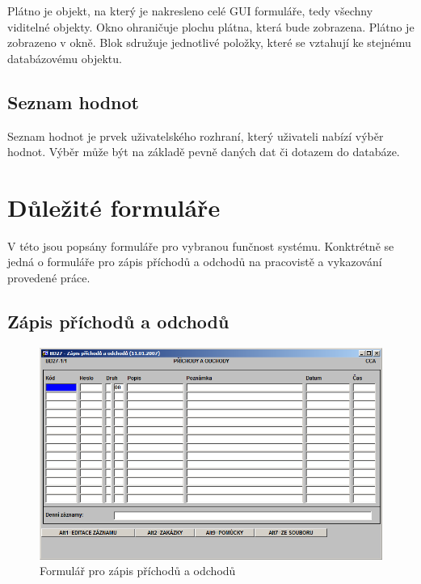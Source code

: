 \documentclass{diplomka}
\begin{document}
Plátno je objekt, na který je nakresleno celé GUI formuláře, tedy všechny viditelné objekty.  Okno ohraničuje plochu plátna, která bude zobrazena. Plátno je zobrazeno v okně. Blok sdružuje jednotlivé položky, které se vztahují ke stejnému databázovému objektu.
\subsection*{Seznam hodnot}
Seznam hodnot je prvek uživatelského rozhraní, který uživateli nabízí výběr hodnot. Výběr může být na základě pevně daných dat či dotazem do databáze.

\section{Důležité formuláře}
V této jsou popsány formuláře pro vybranou funčnost systému. 
 Konktrétně se jedná o formuláře pro zápis příchodů a odchodů na pracovistě a vykazování provedené práce.
\subsection{Zápis příchodů a odchodů}
\begin{figure}[H]
  \centering
  \includegraphics[scale=0.7]{obr/BD27.png}
\caption{Formulář pro zápis příchodů a odchodů}
\label{fig:att}
\end{figure}
\end{document}
